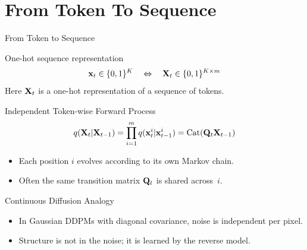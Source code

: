 \documentclass{beamer}
\begin{document}
\section{From Token To Sequence}
\begin{frame}{From Token to Sequence}
    \begin{block}{One-hot sequence representation}
        \vspace{-0.3cm}
        \[
            \mathbf{x}_t \in \{0,1\}^K
            \quad\Leftrightarrow\quad
            \mathbf{X}_t \in \{0,1\}^{K \times m}
        \]
        \vspace{-0.2cm}
        Here $\mathbf{X}_t$ is a one-hot representation of a sequence of tokens.
    \end{block}
    \eqpause
    \begin{block}{Independent Token-wise Forward Process}
        \vspace{-0.3cm}
        \[
            q(\mathbf{X}_t |\mathbf{X}_{t-1}) =
            \prod_{i=1}^m q(\mathbf{x}_t^i |\mathbf{x}_{t-1}^i) = \operatorname{Cat}(\mathbf{Q}_t \mathbf{X}_{t-1})
        \]
        \vspace{-0.3cm}
        \begin{itemize}
            \item Each position $i$ evolves according to its own Markov chain.
            \item Often the same transition matrix $\mathbf{Q}_t$ is shared across~$i$.
        \end{itemize}
    \end{block}
    \eqpause
    \begin{block}{Continuous Diffusion Analogy}
        \begin{itemize}
            \item In Gaussian DDPMs with diagonal covariance, noise is independent per pixel.
            \item Structure is not in the noise; it is learned by the reverse model.
        \end{itemize}
    \end{block}
\end{frame}
\end{document}
